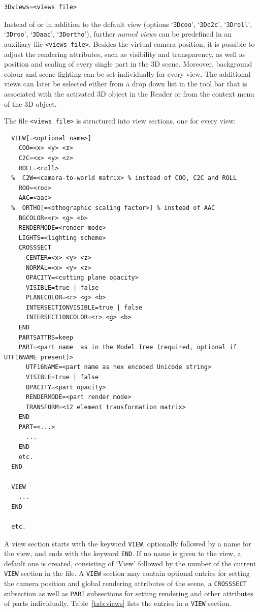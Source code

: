 \documentclass[a4paper]{article}
\begin{document}
\hypertarget{3Dviews}{}%
\begin{verbatim}
3Dviews=<views file>
\end{verbatim}
Instead of or in addition to the default view (options `\verb+3Dcoo+', `\verb+3Dc2c+', `\verb+3Droll+', `\verb+3Droo+', `\verb+3Daac+', `\verb+3Dortho+'), further \emph{named views} can be predefined in an auxiliary file \verb+<views file>+. Besides the virtual camera position, it is possible to adjust the rendering attributes, such as visibility and transparency, as well as position and scaling of every single part in the 3D scene. Moreover, background colour and scene lighting can be set individually for every view. The additional views can later be selected either from a drop down list in the tool bar that is associated with the activated 3D object in the Reader or from the context menu of the 3D object.

The file \verb+<views file>+ is structured into view sections, one for every view:
\begin{verbatim}
  VIEW[=<optional name>]
    COO=<x> <y> <z>
    C2C=<x> <y> <z>
    ROLL=<roll>
  %  C2W=<camera-to-world matrix> % instead of COO, C2C and ROLL
    ROO=<roo>
    AAC=<aac>
  %  ORTHO[=<othographic scaling factor>] % instead of AAC
    BGCOLOR=<r> <g> <b>
    RENDERMODE=<render mode>
    LIGHTS=<lighting scheme>
    CROSSSECT
      CENTER=<x> <y> <z>
      NORMAL=<x> <y> <z>
      OPACITY=<cutting plane opacity>
      VISIBLE=true | false
      PLANECOLOR=<r> <g> <b>
      INTERSECTIONVISIBLE=true | false
      INTERSECTIONCOLOR=<r> <g> <b>
    END
    PARTSATTRS=keep
    PART=<part name  as in the Model Tree (required, optional if UTF16NAME present)>
      UTF16NAME=<part name as hex encoded Unicode string>
      VISIBLE=true | false
      OPACITY=<part opacity>
      RENDERMODE=<part render mode>
      TRANSFORM=<12 element transformation matrix>
    END
    PART=<...>
      ...
    END
    etc.
  END

  VIEW
    ...
  END

  etc.
\end{verbatim}
A view section starts with the keyword \verb+VIEW+, optionally followed by a name for the view, and ends with the keyword \verb+END+. If no name is given to the view, a default one is created, consisting of `View' followed by the number of the current \verb+VIEW+ section in the file. A \verb+VIEW+ section may contain optional entries for setting the camera position and global rendering attributes of the scene, a \verb+CROSSSECT+ subsection as well as \verb+PART+ subsections for setting rendering and other attributes of parts individually. Table~\ref{tab:views} lists the entries in a \verb+VIEW+ section.
\end{document}
